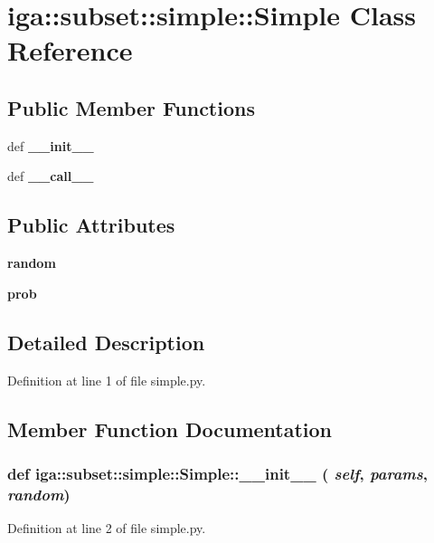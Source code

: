 \section{iga::subset::simple::Simple Class Reference}
\label{classiga_1_1subset_1_1simple_1_1Simple}
\subsection*{Public Member Functions}
\begin{CompactItemize}
\item 
def {\bf \_\-\_\-init\_\-\_\-}
\item 
def {\bf \_\-\_\-call\_\-\_\-}
\end{CompactItemize}
\subsection*{Public Attributes}
\begin{CompactItemize}
\item 
{\bf random}
\item 
{\bf prob}
\end{CompactItemize}


\subsection{Detailed Description}


Definition at line 1 of file simple.py.

\subsection{Member Function Documentation}
\subsubsection{\setlength{\rightskip}{0pt plus 5cm}def iga::subset::simple::Simple::\_\-\_\-init\_\-\_\- ( {\em self},  {\em params},  {\em random})}\label{classiga_1_1subset_1_1simple_1_1Simple_b7bd3e757ed5f1aff9cb300024463096}




Definition at line 2 of file simple.py.
